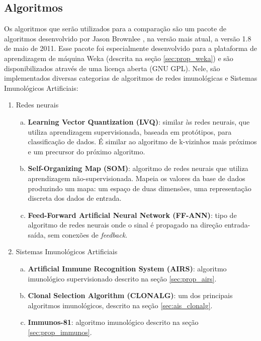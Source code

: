 \subsection{Algoritmos}

Os algoritmos que serão utilizados para a comparação são um pacote de algoritmos desenvolvido por Jason Brownlee \cite{Brownlee2011}, na versão mais atual, a versão 1.8 de maio de 2011. Esse pacote foi especialmente desenvolvido para a plataforma de aprendizagem de máquina Weka (descrita na seção \ref{sec:prop_weka}) e são disponibilizados através de uma licença aberta (GNU GPL). Nele, são implementados diversas categorias de algoritmos de redes imunológicas e Sistemas Imunológicos Artificiais:

\begin{enumerate}
    \item Redes neurais
    \begin{enumerate}[a)]
        \item \textbf{Learning Vector Quantization (LVQ)}: similar às redes neurais, que utiliza aprendizagem supervisionada, baseada em protótipos, para classificação de dados. É similar ao algoritmo de k-vizinhos mais próximos e um precursor do próximo algoritmo.
        \item \textbf{Self-Organizing Map (SOM)}: algoritmo de redes neurais que utiliza aprendizagem não-supervisionada. Mapeia os valores da base de dados produzindo um mapa: um espaço de duas dimensões, uma representação discreta dos dados de entrada.
        \item \textbf{Feed-Forward Artificial Neural Network (FF-ANN)}: tipo de algoritmo de redes neurais onde o sinal é propagado na direção entrada-saída, sem conexões de \emph{feedback}.
    \end{enumerate}
    \item Sistemas Imunológicos Artificiais
    \begin{enumerate}[a)]
        \item \textbf{Artificial Immune Recognition System (AIRS)}: algoritmo imunológico supervisionado descrito na seção \ref{sec:prop_airs}.
        \item \textbf{Clonal Selection Algorithm (CLONALG)}: um dos principais algoritmos imunológicos, descrito na seção \ref{sec:ais_clonalg}.
        \item \textbf{Immunos-81}: algoritmo imunológico descrito na seção \ref{sec:prop_immunos}.
    \end{enumerate}
\end{enumerate}


